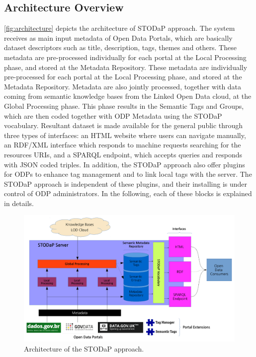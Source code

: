 \subsection{Architecture Overview}
\label{sec:stodap_architecture_overview}

\autoref{fig:architecture} depicts the architecture of STODaP approach.
The system receives as main input metadata of Open Data Portals, which are basically dataset descriptors such as title, description, tags, themes and others.
These metadata are pre-processed individually for each portal at the Local Processing phase, and stored at the Metadata Repository.
These metadata are individually pre-processed for each portal at the Local Processing phase, and stored at the Metadata Repository.
Metadata are also jointly processed, together with data coming from semantic knowledge bases from the Linked Open Data cloud, at the Global Processing phase.
This phase results in the Semantic Tags and Groups, which are then coded together with ODP Metadata using the STODaP vocabulary.
Resultant dataset is made available for the general public through three types of interfaces: an HTML website where users can navigate manually, an RDF/XML interface which responds to machine requests searching for the resources URIs, and a SPARQL endpoint, which accepts queries and responds with JSON coded triples.
In addition, the STODaP approach also offer plugins for ODPs to enhance tag management and to link local tags with the server.
The STODaP approach is independent of these plugins, and their installing is under control of ODP administrators.
In the following, each of these blocks is explained in details.

\begin{figure}[t]
\begin{center}
\includegraphics[width=\columnwidth]{images/architecture.pdf}
\caption[Architecture of the STODaP approach.]{Architecture of the STODaP approach.}
\label{fig:architecture}
\end{center}
\end{figure}

